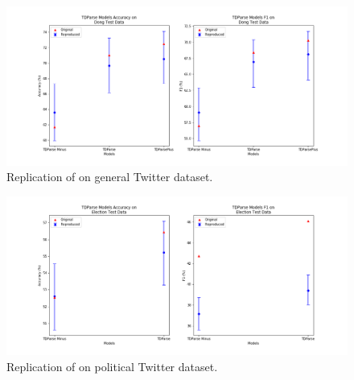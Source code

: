 \begin{figure}
    \centering
    \includegraphics[scale=0.55]{images/reproducibility/Replication_Cases/TDParse_Replication_Dong.png}
    \caption{Replication of \citet{repro_wang_2017} on \citet{repro_dong_2014} general Twitter dataset.}
    \label{fig:repro_wang_dong_method}
\end{figure}

\begin{figure}
    \centering
    \includegraphics[scale=0.55]{images/reproducibility/Replication_Cases/TDParse_Replication_Election.png}
    \caption{Replication of \citet{repro_wang_2017} on \citet{repro_wang_2017} political Twitter dataset.}
    \label{fig:repro_wang_elec_method}
\end{figure}

